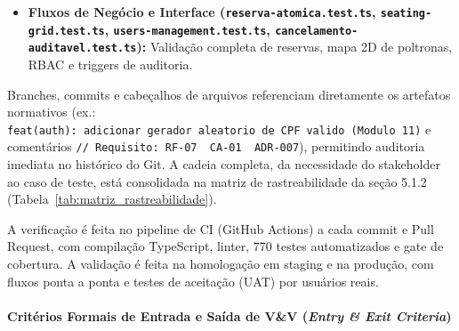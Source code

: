 \begin{itemize}
\item \textbf{Fluxos de Negócio e Interface (\texttt{reserva-\allowbreak\hspace{0pt plus 1pt}atomica.\allowbreak\hspace{0pt plus 1pt}test.\allowbreak\hspace{0pt plus 1pt}ts}, \texttt{seating-\allowbreak\hspace{0pt plus 1pt}grid.\allowbreak\hspace{0pt plus 1pt}test.\allowbreak\hspace{0pt plus 1pt}ts}, \texttt{users-\allowbreak\hspace{0pt plus 1pt}management.\allowbreak\hspace{0pt plus 1pt}test.\allowbreak\hspace{0pt plus 1pt}ts}, \texttt{cancelamento-\allowbreak\hspace{0pt plus 1pt}auditavel.\allowbreak\hspace{0pt plus 1pt}test.\allowbreak\hspace{0pt plus 1pt}ts}):} Validação completa de reservas, mapa 2D de poltronas, RBAC e triggers de auditoria.
\end{itemize}


Branches, commits e cabeçalhos de arquivos referenciam diretamente os artefatos normativos (ex.: \texttt{feat(auth):\ adicionar\ gerador\ aleatorio\ de\ CPF\ valido\ (Modulo\ 11)} e comentários \texttt{//\ Requisito:\ RF-07\ \textbar{}\ CA-01\ \textbar{}\ ADR-007}), permitindo auditoria imediata no histórico do Git. A cadeia completa, da necessidade do stakeholder ao caso de teste, está consolidada na matriz de rastreabilidade da seção 5.1.2 (Tabela~\ref{tab:matriz_rastreabilidade}).



A verificação é feita no pipeline de CI (GitHub Actions) a cada commit e Pull Request, com compilação TypeScript, linter, 770 testes automatizados e gate de cobertura. A validação é feita na homologação em staging e na produção, com fluxos ponta a ponta e testes de aceitação (UAT) por usuários reais.

\paragraph{\texorpdfstring{Critérios Formais de Entrada e Saída de V\&V (\emph{Entry \& Exit Criteria})}{Critérios Formais de Entrada e Saída de V\&V (Entry \& Exit Criteria)}}

